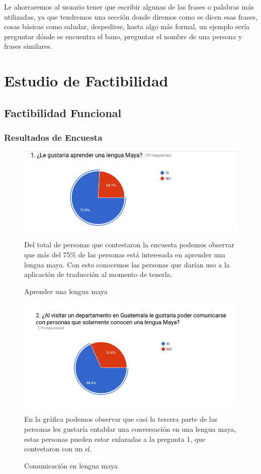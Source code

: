 \documentclass[a4paper,openright,11pt]{article}
\begin{document}
Le ahorraremos al usuario tener que escribir algunas de las frases o palabras m\'as utilizadas, ya que tendremos una secci\'on donde diremos como se dicen esas frases, cosas b\'asicas como saludar, despedirse, hasta algo m\'as formal, un ejemplo ser\'ia preguntar d\'onde se encuentra el bano, preguntar el nombre de una persona y frases similares.\\
\newpage

\section{Estudio de Factibilidad}
\subsection{Factibilidad Funcional}
\subsubsection{Resultados de Encuesta}
\begin{figure}[H]
	\includegraphics[width=1.0\textwidth]{e1}
	\caption{Aprender una lengua maya}
	\label{fig:e1}
	Del total de personas que contestaron la encuesta podemos observar que más del 75\% de las personas está interesada en aprender una lengua maya. Con esto conocemos las personas que darían uso a la aplicación de traducción al momento de tenerla.
\end{figure}
\begin{figure}[H]
	\includegraphics[width=1.0\textwidth]{e2}
	\caption{Comunicación en lengua maya}
	\label{fig:e2}
	En la gráfica podemos observar que casi la tercera parte de las personas les gustaría entablar una conversación en una lengua maya, estas personas pueden estar enlazadas a la pregunta 1, que contestaron con un sí.
\end{figure}
\end{document}
